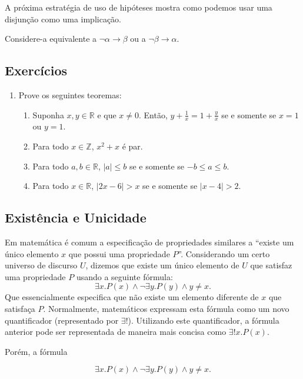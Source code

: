 A próxima estratégia de uso de hipóteses mostra como podemos usar uma
disjunção como uma implicação.

\begin{HypothesisStrategy}
Considere-a equivalente a $\neg\alpha\to \beta$ ou a $\neg\beta\to\alpha$.
\end{HypothesisStrategy}


\subsection{Exercícios}

\begin{enumerate}
\item Prove os seguintes teoremas:
\begin{enumerate}
    \item Suponha $x,y\in\mathbb{R}$ e que $x\neq 0$. Então, $y +
      \frac{1}{x} = 1 +\frac{y}{x}$ se e somente se $x = 1$ ou $y =
      1$.
    \item Para todo $x\in\mathbb{Z}$, $x^2 + x$ é par.
    \item Para todo $a,b\in\mathbb{R}$, $|a|\leq b$ se e somente se $-b
      \leq a \leq b$.
    \item Para todo $x\in\mathbb{R}$, $|2x - 6| > x$ se e somente se
      $|x - 4| > 2$.
\end{enumerate}
\end{enumerate}


\subsection{Existência e Unicidade}

Em matemática é comum a especificação de propriedades similares a
``existe um único elemento $x$ que possui uma propriedade $P$''.
Considerando um certo universo de discurso $U$, dizemos que existe um
único elemento de $U$ que satisfaz uma propriedade $P$ usando a seguinte
fórmula:
\[
\exists x. P(x) \land \neg \exists y. P(y) \land y \neq x.
\]
Que essencialmente especifica que não existe um elemento diferente de
$x$ que satisfaça $P$. Normalmente, matemáticos expressam esta fórmula
como um novo quantificador (representado por $\exists !$). Utilizando
este quantificador, a fórmula anterior pode ser representada de
maneira mais concisa como $\exists ! x.P(x)$.

Porém, a fórmula

\[\exists x. P(x) \land \neg \exists y. P(y) \land y \neq x.\]

